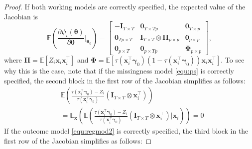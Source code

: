 \documentclass[12pt, A4]{article}
\newcommand{\ObsCov}{\textbf{x}_i}
\newcommand{\LogCoe}{\boldsymbol{\gamma}}
\newcommand{\IdenMat}{\textbf{I}}
\begin{document}
\begin{proof}
        If both working models are correctly specified, the expected value of the Jacobian is 
            \begin{equation*}
                \mathbb{E} \left( \frac{\partial \psi_i(\boldsymbol{\theta})}{ \partial \boldsymbol{\theta}} \biggr\rvert_{\boldsymbol{\theta}_0} \right) 
                    = \begin{bmatrix}
                    -\IdenMat_{T \times T} & \textbf{0}_{T \times Tp} & \textbf{0}_{T \times p}\\ 
                    \textbf{0}_{Tp \times T} & \IdenMat_{T \times T} \otimes \boldsymbol{\Pi}_{p \times p} & \textbf{0}_{p \times p}\\ 
                    \textbf{0}_{p \times T} & \textbf{0}_{p \times Tp} & \boldsymbol{\Phi}_{p \times p}
                    \end{bmatrix},
            \end{equation*}
        where $\boldsymbol{\Pi} = \mathbb{E}\left[ Z_i\textbf{x}_i\textbf{x}_i^{\top} \right]$ and $\boldsymbol{\Phi} = \mathbb{E}\left[\tau(\ObsCov^{\top} \LogCoe_0)(1-\tau(\ObsCov^{\top} \LogCoe_0)) \ObsCov\ObsCov^{\top}\right]$.
        To see why this is the case, note that if the missingness model \eqref{equ:ps} is correctly specified, the second block in the first row of the Jacobian simplifies as follows: 
            \begin{align*}
                & \mathbb{E}\left(\frac{\tau(\ObsCov^{\top} \LogCoe_0)- Z_i}{\tau(\ObsCov^{\top} \LogCoe_0)} (\IdenMat_{T \times T} \otimes \ObsCov^{\top})\right) \\
                &= \mathbb{E}_{\textbf{x}} \left( \mathbb{E} \left( \frac{\tau(\ObsCov^{\top} \LogCoe_0)- Z_i}{\tau(\ObsCov^{\top} \LogCoe_0)} (\IdenMat_{T \times T} \otimes \ObsCov^{\top}) \biggr\rvert \ObsCov \right) \right) = 0
            \end{align*}
        If the outcome model \eqref{equ:regmod2} is correctly specified, the third block in the first row of the Jacobian simplifies as follows:

\end{proof}
\end{document}
